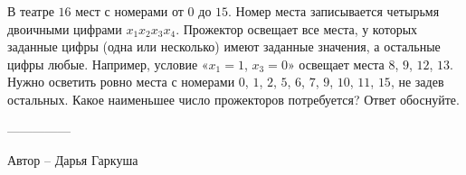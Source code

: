 \question
В театре $16$ мест с номерами от $0$ до $15$. Номер места записывается четырьмя двоичными цифрами $x_1x_2x_3x_4$. Прожектор освещает все места, у которых заданные цифры (одна или несколько) имеют заданные значения, а остальные цифры любые. Например, условие «$x_1=1$, $x_3=0$» освещает места $8$, $9$, $12$, $13$. Нужно осветить ровно места с номерами $0$, $1$, $2$, $5$, $6$, $7$, $9$, $10$, $11$, $15$, не задев остальных. Какое наименьшее число прожекторов потребуется? Ответ обоснуйте.

---------------

Автор -- Дарья Гаркуша